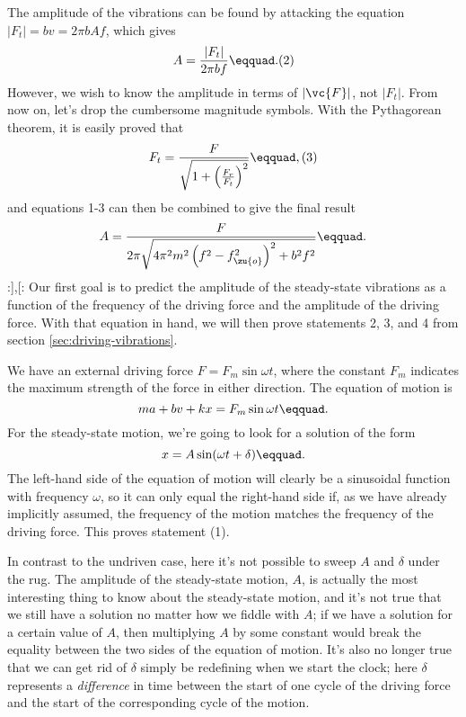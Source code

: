 The amplitude of the vibrations can be found by attacking
the equation $|F_t|=bv=2\pi bAf$, which gives
\begin{equation}
  A = \frac{|F_t|}{2\pi bf}\eqquad. (2)
\end{equation}
However, we wish to know the amplitude in terms of $|\vc{F}|$, not
$|F_t|$. From now on, let's drop the cumbersome magnitude
symbols. With the Pythagorean theorem, it is easily proved that
\begin{equation}
  F_t = \frac{F}{\sqrt{1+\left(\frac{F_r}{F_t}\right)^2}}\eqquad, (3)
\end{equation}
and equations 1-3 can then be combined to give the final result
\begin{equation}\label{resonance-amplitude-equation}
 A = \frac{F}{2\pi\sqrt{4\pi^2m^2\left(f^2-f_\zu{o}^2\right)^2+b^2f^2}}\eqquad.
\end{equation}
:],[:
Our first goal is to predict the amplitude of the steady-state
vibrations as a function of the frequency of the driving
force and the amplitude of the driving force. With that
equation in hand, we will then prove statements 2, 3, and 4
from  section \ref{sec:driving-vibrations}.

        We have an external driving force $F=F_m \sin \omega t$, where the constant
        $F_m$ indicates the maximum strength of the force in either direction. The equation
        of motion is
        \begin{equation}\label{eqn:resonancemotion}
                ma+bv+kx = F_m \sin \omega t 
\eqquad.
        \end{equation}
        For the steady-state motion,
        we're going to look for a solution of the form
        \begin{equation*}
                x = A \sin (\omega{}t+\delta)\eqquad.
        \end{equation*}
        The left-hand side of the equation of motion will clearly be a sinusoidal function with frequency $\omega$,
        so it can only equal the right-hand side if, as we have already implicitly assumed, the frequency of the
        motion matches the frequency of the driving force. This proves statement (1).

        In contrast to the undriven case, here it's not possible to sweep $A$ and $\delta$ 
        under the rug. The amplitude of the steady-state motion, $A$, is actually the
        most interesting thing to know about the steady-state motion, and it's not true that we
        still have a solution no matter how we fiddle with $A$; if we have a solution for
        a certain value of $A$, then multiplying $A$ by some constant would break the
        equality between the two sides of the equation of motion. It's also no longer true
        that we can get rid of $\delta$ simply be redefining when we start the clock; here
        $\delta$ represents a \emph{difference} in time between the start of one cycle of the driving
        force and the start of the corresponding cycle of the motion.

